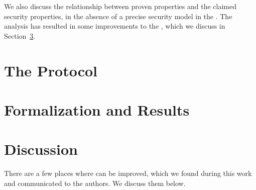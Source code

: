 \documentclass[runningheads, envcountsame, hidelinks, a4paper, draft, x11names]{llncs}
\begin{document}
%
We also discuss the relationship between proven properties and the claimed
security properties, in the absence of a precise security model in the \mSpec.
%
The analysis has resulted in some improvements to the \mSpec,
which we discuss in Section~\ref{sec:discussion}.
%

\section{The \mEdhoc{} Protocol}
\label{sec:edhoc}


\section{Formalization and Results}
\label{sec:formalization}


\section{Discussion}
\label{sec:discussion}
There are a few places where \mEdhoc{} can be improved,
which we found during this work and communicated to the authors.
%
We discuss them below.
%

%
\end{document}
